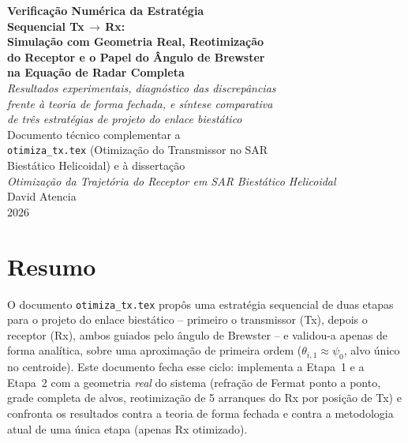 \documentclass[12pt,a4paper,oneside]{book}
\theoremstyle{definition}
\theoremstyle{remark}
\begin{document}
\frontmatter

\begin{titlepage}
\centering
\vspace*{2cm}
{\LARGE\bfseries Verificação Numérica da Estratégia\\
Sequencial Tx$\,\to\,$Rx:\\[0.3cm]
Simulação com Geometria Real, Reotimização\\
do Receptor e o Papel do Ângulo de Brewster\\
na Equação de Radar Completa}\\[1.2cm]
{\large\itshape Resultados experimentais, diagnóstico das discrepâncias\\
frente à teoria de forma fechada, e síntese comparativa\\
de três estratégias de projeto do enlace biestático}\\[2cm]
{\normalsize Documento técnico complementar a\\
\texttt{otimiza\_tx.tex} (Otimização do Transmissor no SAR\\
Biestático Helicoidal) e à dissertação\\
\textit{Otimização da Trajetória do Receptor em SAR Biestático Helicoidal}}\\[2cm]
{\normalsize David Atencia}\\[0.4cm]
{\normalsize 2026}
\vfill
\end{titlepage}

\chapter*{Resumo}

O documento \texttt{otimiza\_tx.tex} propôs uma estratégia sequencial de duas
etapas para o projeto do enlace biestático -- primeiro o transmissor (Tx),
depois o receptor (Rx), ambos guiados pelo ângulo de Brewster -- e validou-a
apenas de forma analítica, sobre uma aproximação de primeira ordem
($\theta_{i,1}\approx\psi_0$, alvo único no centroide). Este documento fecha
esse ciclo: implementa a Etapa~1 e a Etapa~2 com a geometria \emph{real} do
sistema (refração de Fermat ponto a ponto, grade completa de alvos,
reotimização de 5 arranques do Rx por posição de Tx) e confronta os
resultados contra a teoria de forma fechada e contra a metodologia atual de
uma única etapa (apenas Rx otimizado).
\end{document}
